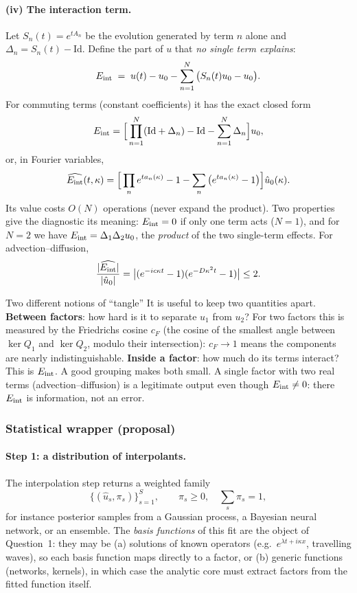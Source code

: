\paragraph{(iv) The interaction term.}
Let $S_n(t)=e^{tA_n}$ be the evolution generated by term $n$ alone and $\Delta_n=S_n(t)-\mathrm{Id}$. Define the part of $u$ that \emph{no single term explains}:
\[
E_{\mathrm{int}}\;=\;u(t)-u_0-\sum_{n=1}^N\big(S_n(t)u_0-u_0\big).
\]
For commuting terms (constant coefficients) it has the exact closed form
\[
E_{\mathrm{int}}=\Big[\prod_{n=1}^N(\mathrm{Id}+\Delta_n)-\mathrm{Id}-\sum_{n=1}^N\Delta_n\Big]u_0,
\]
or, in Fourier variables,
\[
\widehat{E_{\mathrm{int}}}(t,\kappa)=\Big[\prod_n e^{ta_n(\kappa)}-1-\sum_n\big(e^{ta_n(\kappa)}-1\big)\Big]\hat u_0(\kappa).
\]
Its value costs $O(N)$ operations (never expand the product). Two properties give the diagnostic its meaning: $E_{\mathrm{int}}=0$ if only one term acts ($N=1$), and for $N=2$ we have $E_{\mathrm{int}}=\Delta_1\Delta_2u_0$, the \emph{product} of the two single-term effects. For advection--diffusion,
\[
\frac{|\widehat{E_{\mathrm{int}}}|}{|\hat u_0|}=\big|(e^{-ic\kappa t}-1)(e^{-D\kappa^2 t}-1)\big|\le 2 .
\]

\begin{notebox}{Two different notions of ``tangle''}
It is useful to keep two quantities apart. \textbf{Between factors}: how hard is it to separate $u_1$ from $u_2$? For two factors this is measured by the Friedrichs cosine $c_F$ (the cosine of the smallest angle between $\ker Q_1$ and $\ker Q_2$, modulo their intersection): $c_F\to1$ means the components are nearly indistinguishable. \textbf{Inside a factor}: how much do its terms interact? This is $E_{\mathrm{int}}$. A good grouping makes both small. A single factor with two real terms (advection--diffusion) is a legitimate output even though $E_{\mathrm{int}}\neq0$: there $E_{\mathrm{int}}$ is information, not an error.
\end{notebox}

\subsubsection{Statistical wrapper (proposal)}\label{sec:wrap}

\paragraph{Step 1: a distribution of interpolants.}
The interpolation step returns a weighted family
\[
\big\{(\hat u_s,\pi_s)\big\}_{s=1}^S,\qquad \pi_s\ge0,\quad \sum_s\pi_s=1,
\]
for instance posterior samples from a Gaussian process, a Bayesian neural network, or an ensemble. The \emph{basis functions} of this fit are the object of Question~1: they may be (a) solutions of known operators (e.g.\ $e^{\lambda t+i\kappa x}$, travelling waves), so each basis function maps directly to a factor, or (b) generic functions (networks, kernels), in which case the analytic core must extract factors from the fitted function itself.

